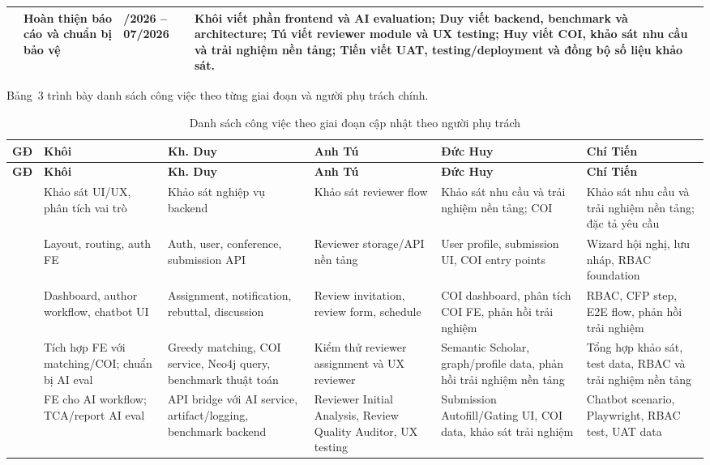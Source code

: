 \documentclass[12pt,a4paper]{article}
\begin{document}
\begin{longtable}{|>{\centering\arraybackslash}p{1cm}|>{\raggedright\arraybackslash}p{3.5cm}|>{\centering\arraybackslash}p{2.5cm}|>{\raggedright\arraybackslash}p{6cm}|}
\hline
7 & Hoàn thiện báo cáo và chuẩn bị bảo vệ & 06/2026 -- 07/2026 & Khôi viết phần frontend và AI evaluation; Duy viết backend, benchmark và architecture; Tú viết reviewer module và UX testing; Huy viết COI, khảo sát nhu cầu và trải nghiệm nền tảng; Tiến viết UAT, testing/deployment và đồng bộ số liệu khảo sát. \\
\hline
\end{longtable}

Bảng~3 trình bày danh sách công việc theo từng giai đoạn và người phụ trách chính.

\begin{longtable}{|>{\centering\arraybackslash}p{1cm}|>{\centering\arraybackslash}p{2.2cm}|>{\centering\arraybackslash}p{2.2cm}|>{\centering\arraybackslash}p{2.2cm}|>{\centering\arraybackslash}p{2.2cm}|>{\centering\arraybackslash}p{2.2cm}|}
\caption{Danh sách công việc theo giai đoạn cập nhật theo người phụ trách} \\
\hline
\textbf{GĐ} & \textbf{Khôi} & \textbf{Kh. Duy} & \textbf{Anh Tú} & \textbf{Đức Huy} & \textbf{Chí Tiến} \\
\hline
\endfirsthead
\hline
\textbf{GĐ} & \textbf{Khôi} & \textbf{Kh. Duy} & \textbf{Anh Tú} & \textbf{Đức Huy} & \textbf{Chí Tiến} \\
\hline
\endhead
1 & Khảo sát UI/UX, phân tích vai trò & Khảo sát nghiệp vụ backend & Khảo sát reviewer flow & Khảo sát nhu cầu và trải nghiệm nền tảng; COI & Khảo sát nhu cầu và trải nghiệm nền tảng; đặc tả yêu cầu \\
\hline
2 & Layout, routing, auth FE & Auth, user, conference, submission API & Reviewer storage/API nền tảng & User profile, submission UI, COI entry points & Wizard hội nghị, lưu nháp, RBAC foundation \\
\hline
3 & Dashboard, author workflow, chatbot UI & Assignment, notification, rebuttal, discussion & Review invitation, review form, schedule & COI dashboard, phân tích COI FE, phản hồi trải nghiệm & RBAC, CFP step, E2E flow, phản hồi trải nghiệm \\
\hline
4 & Tích hợp FE với matching/COI; chuẩn bị AI eval & Greedy matching, COI service, Neo4j query, benchmark thuật toán & Kiểm thử reviewer assignment và UX reviewer & Semantic Scholar, graph/profile data, phản hồi trải nghiệm nền tảng & Tổng hợp khảo sát, test data, RBAC và trải nghiệm nền tảng \\
\hline
5 & FE cho AI workflow; TCA/report AI eval & API bridge với AI service, artifact/logging, benchmark backend & Reviewer Initial Analysis, Review Quality Auditor, UX testing & Submission Autofill/Gating UI, COI data, khảo sát trải nghiệm & Chatbot scenario, Playwright, RBAC test, UAT data \\

\end{longtable}
\end{document}
